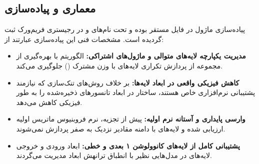\subsection{معماری و پیاده‌سازی}
پیاده‌سازی ماژول در فایل  مستقر بوده و تحت نام‌های  و  در رجیستری فریم‌ورک ثبت گردیده است. مشخصات فنی این پیاده‌سازی عبارتند از:
\begin{itemize}
    \item \textbf{مدیریت یکپارچه لایه‌های متوالی و ماژول‌های اشتراکی:} الگوریتم با بهره‌گیری از مجموعه  از پردازش تکراری لایه‌های با وزن مشترک () جلوگیری می‌کند.
    \item \textbf{کاهش فیزیکی واقعی در ابعاد لایه‌ها:} بر خلاف روش‌های تنک‌سازی که نیازمند پشتیبانی نرم‌افزاری خاص هستند، ساختار  در  ابعاد تانسورهای ذخیره‌شده را به طور فیزیکی کاهش می‌دهد.
    \item \textbf{وارسی پایداری و آستانه نرم اولیه:} پیش از تجزیه، نرم فروبنیوس ماتریس اولیه ارزیابی شده و لایه‌های با دامنه مقادیر نزدیک به صفر پردازش نمی‌شوند.
    \item \textbf{پشتیبانی کامل از لایه‌های کانوولوشن ۱ بعدی و خطی:} ابعاد ورودی و خروجی لایه‌های  در مدل‌هایی نظیر  با انطباق ترانهش ابعاد مدیریت می‌گردند.
\end{itemize}

